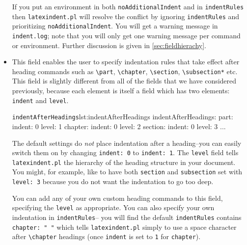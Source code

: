 \documentclass[11pt]{article}
\newcommand{\verbitem}[1]{\small\PVerb{#1}}
\begin{document}
\begin{itemize}
	If you put an environment in both \lstinline!noAdditionalIndent! and in
	\lstinline!indentRules! then \lstinline!latexindent.pl! will resolve the conflict
	by ignoring \lstinline!indentRules! and prioritizing \lstinline!noAdditionalIndent!.
	You will get a warning message in \lstinline!indent.log!; note that you will only
	get one warning message per command or environment. Further discussion
	is given in \cref{sec:fieldhierachy}.

	\item[\verbitem{indentAfterHeadings}] This field enables the user to specify
	      indentation rules that take effect after heading commands such as \lstinline!\part!, \lstinline!\chapter!,
	      \lstinline!\section!, \lstinline!\subsection*! etc. This field is slightly different from all
	      of the fields that we have considered previously, because each element is
	      itself a field which has two elements: \lstinline!indent! and \lstinline!level!.
	      \begin{cmhlistings}[style=yaml]{\lstinline!indentAfterHeadings!}{lst:indentAfterHeadings}
indentAfterHeadings:
    part:
       indent: 0
       level: 1
    chapter:
       indent: 0
       level: 2
    section:
       indent: 0
       level: 3
    ...
	\end{cmhlistings}
	The default settings do \emph{not} place indentation after a heading--you
	can easily switch them on by changing \lstinline!indent: 0! to \lstinline!indent: 1!.
	The \lstinline!level! field tells \lstinline!latexindent.pl! the hierarchy of the heading
	structure in your document. You might, for example, like to have both \lstinline!section!
	and \lstinline!subsection! set with \lstinline!level: 3! because you do not want the indentation to go too deep.

	You can add any of your own custom heading commands to this field, specifying the \lstinline!level!
	as appropriate.  You can also specify your own indentation in \lstinline!indentRules!--
	you will find the default \lstinline!indentRules! contains \lstinline!chapter: " "! which
	tells \lstinline!latexindent.pl! simply to use a space character after \lstinline!\chapter! headings
	(once \lstinline!indent! is set to \lstinline!1! for \lstinline!chapter!).


\end{itemize}
\end{document}
